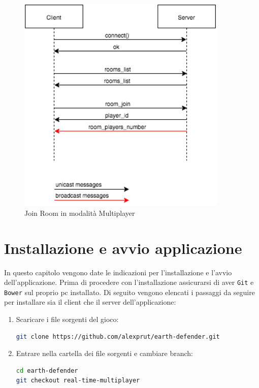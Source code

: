 \documentclass[paper=a4, fontsize=11pt]{scrartcl} %
\numberwithin{equation}{section} %
\numberwithin{figure}{section} %
\numberwithin{table}{section} %
\begin{document}
\begin{figure}
\centering
\includegraphics[width=10cm]{MultiplayerJoinRoom}
\caption{Join Room in modalità Multiplayer}
\label{JoinRoom}
\end{figure}


\section{Installazione e avvio applicazione}
In questo capitolo vengono date le indicazioni per l'installazione e l'avvio dell'applicazione.
Prima di procedere con l'installazione assicurarsi di aver \texttt{Git}\cite{git} e \texttt{Bower}\cite{bower} sul proprio pc installato.
Di seguito vengono elencati i passaggi da seguire per installare sia il client che il server dell'applicazione:
\begin{enumerate}  
\item
Scaricare i file sorgenti del gioco:
\begin{lstlisting}[language=bash]
git clone https://github.com/alexprut/earth-defender.git
\end{lstlisting}

\item
Entrare nella cartella dei file sorgenti e cambiare branch:
\begin{lstlisting}[language=bash]
cd earth-defender
git checkout real-time-multiplayer
\end{lstlisting}
\end{enumerate}
\end{document}

